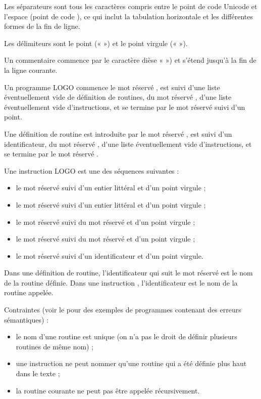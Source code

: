 Les séparateurs sont tous les caractères compris entre le point de code Unicode  et l’espace (point de code ), ce qui inclut la tabulation horizontale et les différentes formes de la fin de ligne.

Les délimiteurs sont le point («  ») et le point virgule (« \tpp{;} »).

Un commentaire commence par le caractère dièse « \tpp{\#} ») et s'étend jusqu'à la fin de la ligne courante.



Un programme LOGO commence le mot réservé , est suivi d'une liste éventuellement vide de définition de routines, du mot réservé , d'une liste éventuellement vide d'instructions, et se termine par le mot réservé  suivi d'un point.

Une définition de routine est introduite par le mot réservé , est suivi d'un identificateur, du mot réservé , d'une liste éventuellement vide d'instructions, et se termine par le mot réservé .

Une instruction LOGO est une des séquences suivantes :
\begin{itemize}
  \item le mot réservé  suivi d'un entier littéral et d'un point virgule ;
  \item le mot réservé  suivi d'un entier littéral et d'un point virgule ;
  \item le mot réservé  suivi du mot réservé  et d'un point virgule ;
  \item le mot réservé  suivi du mot réservé  et d'un point virgule ;
  \item le mot réservé  suivi d'un identificateur et d'un point virgule.
\end{itemize}


Dans une définition de routine, l'identificateur qui suit le mot réservé  est le nom de la routine définie. Dans une instruction , l'identificateur est le nom de la routine appelée.

Contraintes (voir le  pour des exemples de programmes contenant des erreurs sémantiques) :
\begin{itemize}
  \item le nom d'une routine est unique (on n'a pas le droit de définir plusieurs routines de même nom) ;
  \item une instruction  ne peut nommer qu'une routine qui a été définie plus haut dans le texte ;
  \item la routine courante ne peut pas être appelée récursivement.
\end{itemize}


